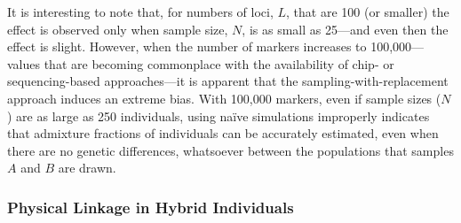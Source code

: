 {\begin{figure}
\caption[\biassimscap]{\biassimscap}
\label{fig:bias-sims}
\end{figure}
It is interesting to note
that, for numbers of loci,  $L$, that are 100 (or smaller) the effect is observed only when
sample size, $N$, is as small as 25---and even then the effect is slight.  However, when the
number of markers increases to 100,000---values that are becoming commonplace with the availability of chip-
or sequencing-based approaches---it is apparent that the sampling-with-replacement approach
induces an extreme bias.  With 100,000 markers, even if sample sizes ($N$) are as large as 250 individuals,
using na\"{i}ve simulations improperly indicates that admixture fractions of individuals can be
accurately estimated, even when there are no genetic differences, whatsoever between the populations that
samples $A$ and $B$ are drawn.

\subsubsection*{Physical Linkage in Hybrid Individuals}

}
